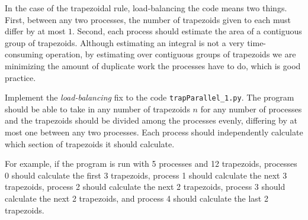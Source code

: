 In the case of the trapezoidal rule, load-balancing the code means two things. First, between any two processes, the number of trapezoids given to each must differ by at most $1$. Second, each process should estimate the area of a contiguous group of trapezoids. Although estimating an integral is not a very time-consuming operation, by estimating over contiguous groups of trapezoids we are minimizing the amount of duplicate work the processes have to do, which is good practice.

\begin{problem}
Implement the \emph{load-balancing} fix to the code \texttt{trapParallel\_1.py}. The program should be able to take in any number of trapezoids $n$ for any number of processes and the trapezoids should be divided among the processes evenly, differing by at most one between any two processes. Each process should independently calculate which section of trapezoids it should calculate.

For example, if the program is run with 5 processes and 12 trapezoids, processes 0 should calculate the first 3 trapezoids, process 1 should calculate the next 3 trapezoids, process 2 should calculate the next 2 trapezoids, process 3 should calculate the next 2 trapezoids, and process 4 should calculate the last 2 trapezoids.
\end{problem}
